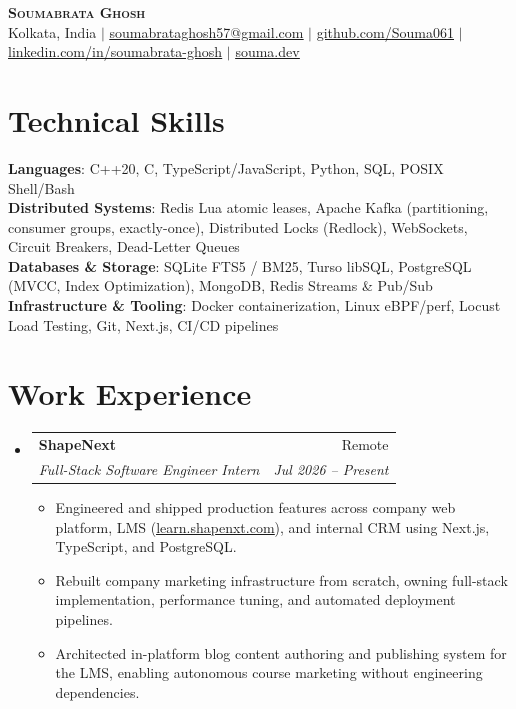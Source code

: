 \documentclass[letterpaper,10pt]{article}
\makeatletter
\newcommand{\resumeItem}[1]{
  \item\small{
    {#1 \vspace{-2pt}}
  }
}
\newcommand{\resumeSubheading}[4]{
  \vspace{-2pt}\item
    \begin{tabular*}{0.97\textwidth}[t]{l@{\extracolsep{\fill}}r}
      \textbf{#1} & #2 \\
      \textit{\small#3} & \textit{\small #4} \\
    \end{tabular*}\vspace{-7pt}
}
\newcommand{\resumeSubHeadingListStart}{\begin{itemize}[leftmargin=0.15in, label={}]}
\newcommand{\resumeSubHeadingListEnd}{\end{itemize}}
\newcommand{\resumeItemListStart}{\begin{itemize}}
\newcommand{\resumeItemListEnd}{\end{itemize}\vspace{-5pt}}
\makeatother
\begin{document}
\begin{center}
    \textbf{\Huge \scshape Soumabrata Ghosh} \\ \vspace{2pt}
    \small Kolkata, India $|$ 
    \href{mailto:soumabrataghosh57@gmail.com}{\underline{soumabrataghosh57@gmail.com}} $|$ 
    \href{https://github.com/Souma061}{\underline{github.com/Souma061}} $|$ 
    \href{https://linkedin.com/in/soumabrata-ghosh}{\underline{linkedin.com/in/soumabrata-ghosh}} $|$ 
    \href{https://souma.dev}{\underline{souma.dev}}
\end{center}

\section{Technical Skills}
 \begin{itemize}[leftmargin=0.15in, label={}]
    \small{\item{
     \textbf{Languages}{: C++20, C, TypeScript/JavaScript, Python, SQL, POSIX Shell/Bash} \\
     \textbf{Distributed Systems}{: Redis Lua atomic leases, Apache Kafka (partitioning, consumer groups, exactly-once), Distributed Locks (Redlock), WebSockets, Circuit Breakers, Dead-Letter Queues} \\
     \textbf{Databases \& Storage}{: SQLite FTS5 / BM25, Turso libSQL, PostgreSQL (MVCC, Index Optimization), MongoDB, Redis Streams \& Pub/Sub} \\
     \textbf{Infrastructure \& Tooling}{: Docker containerization, Linux eBPF/perf, Locust Load Testing, Git, Next.js, CI/CD pipelines}
    }}
 \end{itemize}

\section{Work Experience}
  \resumeSubHeadingListStart
    \resumeSubheading
      {ShapeNext}{Remote}
      {Full-Stack Software Engineer Intern}{Jul 2026 -- Present}
      \resumeItemListStart
        \resumeItem{Engineered and shipped production features across company web platform, LMS (\href{https://learn.shapenxt.com}{\underline{learn.shapenxt.com}}), and internal CRM using Next.js, TypeScript, and PostgreSQL.}
        \resumeItem{Rebuilt company marketing infrastructure from scratch, owning full-stack implementation, performance tuning, and automated deployment pipelines.}
        \resumeItem{Architected in-platform blog content authoring and publishing system for the LMS, enabling autonomous course marketing without engineering dependencies.}
      \resumeItemListEnd
  \resumeSubHeadingListEnd
\end{document}
